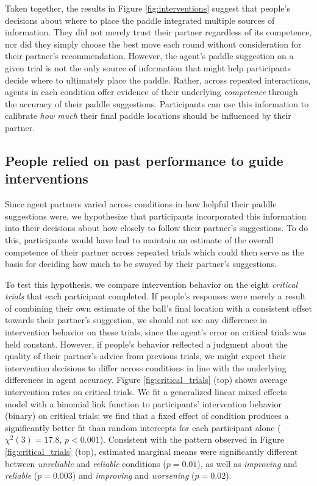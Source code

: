 \documentclass[10pt,letterpaper]{article}
\begin{document}
Taken together, the results in Figure \ref{fig:interventions} suggest that people's decisions about where to place the paddle integrated multiple sources of information. They did not merely trust their partner regardless of its competence, nor did they simply choose the best move each round without consideration for their partner's recommendation. However, the agent's paddle suggestion on a given trial is not the only source of information that might help participants decide where to ultimately place the paddle. Rather, across repeated interactions, agents in each condition offer evidence of their underlying \textit{competence} through the accuracy of their paddle suggestions. Participants can use this information to calibrate \textit{how much} their final paddle locations should be influenced by their partner. 


\subsection{People relied on past performance to guide interventions}

Since agent partners varied across conditions in how helpful their paddle suggestions were, we hypothesize that participants incorporated this information into their decisions about how closely to follow their partner's suggestions. To do this, participants would have had to maintain an estimate of the overall competence of their partner across repeated trials which could then serve as the basis for deciding how much to be swayed by their partner's suggestions. 

To test this hypothesis, we compare intervention behavior on the eight \textit{critical trials} that each participant completed. If people's responses were merely a result of combining their own estimate of the ball's final location with a consistent offset towards their partner's suggestion, we should not see any difference in intervention behavior on these trials, since the agent's error on critical trials was held constant. However, if people's behavior reflected a judgment about the quality of their partner's advice from previous trials, we might expect their intervention decisions to differ across conditions in line with the underlying differences in agent accuracy. Figure \ref{fig:critical_trials} (top) shows average intervention rates on critical trials. We fit a generalized linear mixed effects model with a binomial link function to participants' intervention behavior (binary) on critical trials; we find that a fixed effect of condition produces a significantly better fit than random intercepts for each participant alone ($\chi^2(3) = 17.8$, $p < 0.001$). Consistent with the pattern observed in Figure \ref{fig:critical_trials} (top), estimated marginal means were significantly different between \textit{unreliable} and \textit{reliable} conditions ($p = 0.01$), as well as \textit{improving} and \textit{reliable} ($p = 0.003$) and \textit{improving} and \textit{worsening} ($p = 0.02$).
\end{document}
